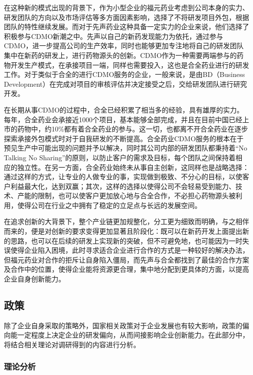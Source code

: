 \documentclass{apa6}
\begin{document}
			在这种新的模式出现的背景下，作为小型企业的福元药业考虑到公司本身的实力、研发团队的方向以及市场评估等多方面因素影响，选择了不将研发项目外包，根据团队的特性继续发展。而对于先声药业这种具备一定实力的企业来说，他们选择了积极参与CDMO新潮之中。先声以自己的新药发现能力为依托，通过参与CDMO，进一步提高公司的生产效率，同时也能够更加专注地将自己的研发团队集中在新药的研发上，进行药物源头的创新。CDMO作为一种需要两端参与的药物开发生产模式，在承接项目一端，同样也需要投入，这也是合全药业进行的研发工作。对于类似于合全的进行CDMO服务的企业，一般来说，是由BD（Business Development）在完成对项目的审核评估并决定接受之后，交给研发团队进行研究开发。
			
			在长期从事CDMO的过程中，合全已经积累了相当多的经验，具有雄厚的实力。每年，合全药业会承接近1000个项目，基本能够全部完成，并且在目前中国已经上市的药物中，约10\%都有着合全药业的参与。这一切，也都离不开合全药业在逐步探索承接外包模式时对于自我研发的不断提高。合全药业CDMO服务的根本在于预见生产中可能出现的问题并予以解决，同时其公司内部的研发团队都秉持着“No Talking No Sharing”的原则，以防止客户的需求及目标，每个团队之间保持着相应的独立性。在另一方面，合全药业始终未从事自主创新，这同样也是战略选择：通过这样的方式，让专业的人做专业的事，实现做到极致、不分心的目标，以使客户利益最大化，达到双赢；其次，这样的选择以使得公司不会轻易受到能力、技术、产能的限制，也可以使客户更加放心地与合全合作，不必担心药物源头被利用，使得公司在行业之中拥有了稳定的立足点与长远的发展空间\citep{RN3}。
			
			
			\begin{framed}
				在追求创新的大背景下，整个产业链更加规整化，分工更为细致而明确，与之相伴而来的，便是对创新的要求变得更加显著且阶段化：既可以在新药开发上面提出新的思路，也可以在后续的研发上实现新的突破，但不可避免地，也可能因为一时失误使得企业陷入困境，此时寻求适合企业进行合作的方式是一种较好的解决办法，但福元药业对合作的拒斥让自身陷入僵局，而先声与合全都找到了最佳的合作方案及合作中的位置，使得企业能将资源更合理，集中地分配到更具体的方面，以提高企业自身创新能力。
			\end{framed}
			
			\subsection{政策}
			除了企业自身采取的策略外，国家相关政策对于企业发展也有较大影响，政策的偏向能一定程度上决定企业的研发偏向，从而间接影响企业创新能力。在此部分中，将结合相关理论对调研得到的内容进行分析。
			\subsubsection{理论分析}
\end{document}
